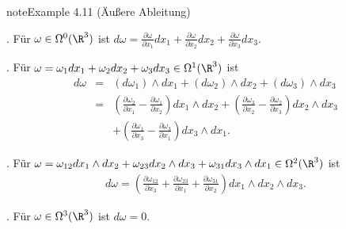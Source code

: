 \documentclass[letterpaper,10pt,english]{jupyterBook}
\begin{document}
\begin{sphinxadmonition}{note}{Example 4.11 (Äußere Ableitung)}



. Für \(\omega\in\Omega^0(\R^3)\) ist \(d\omega = \frac{\partial\omega}{\partial x_1}dx_1+
\frac{\partial\omega}{\partial x_2}dx_2+\frac{\partial\omega}{\partial x_3}dx_3\).



. Für \(\omega = \omega_1dx_1+\omega_2dx_2+\omega_3dx_3\in\Omega^1(\R^3)\) ist
\begin{equation*}
\begin{split}d\omega &=& (d\omega_1)\wedge dx_1+(d\omega_2)\wedge dx_2+(d\omega_3)\wedge
dx_3\\
&=& \left(\frac{\partial\omega_2}{\partial x_1}-\frac{\partial\omega_1}{\partial x_2}\right)
dx_1\wedge dx_2+ \left(\frac{\partial\omega_3}{\partial x_2}-\frac{\partial\omega_2}{\partial x_3}\right)
dx_2\wedge dx_3\\
&& + \left(\frac{\partial\omega_1}{\partial x_3}-\frac{\partial\omega_3}{\partial x_1}\right)
dx_3\wedge dx_1.\end{split}
\end{equation*}


. Für \(\omega = \omega_{12}dx_1\wedge dx_2+\omega_{23}dx_2\wedge dx_3
+\omega_{31}dx_3\wedge dx_1 \in\Omega^2(\R^3)\) ist
\begin{equation*}
\begin{split}d\omega = \left(\frac{\partial\omega_{12}}{\partial x_3} + \frac{\partial\omega_{23}}{\partial x_1}
+ \frac{\partial\omega_{31}}{\partial x_2}\right)dx_1\wedge dx_2\wedge dx_3.\end{split}
\end{equation*}


. Für \(\omega\in\Omega^3(\R^3)\) ist \(d\omega=0\).
\end{sphinxadmonition}
\end{document}
